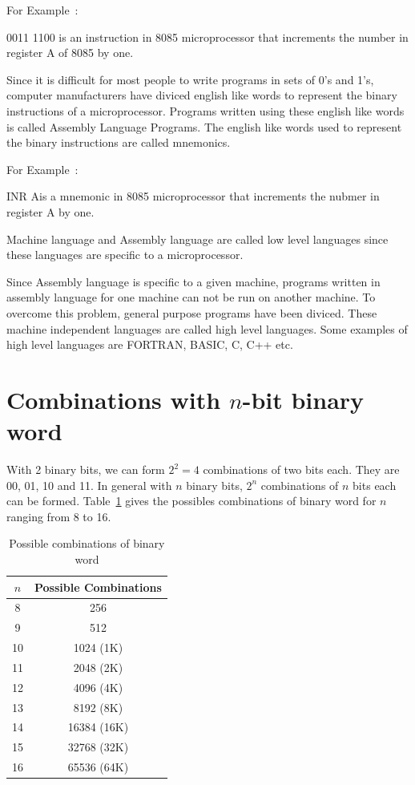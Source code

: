 For Example~:

0011 1100 is an instruction in 8085 microprocessor that increments the number in register A of 8085 by one.

\medskip
{}

Since it is difficult for most people to write programs in sets of 0's and 1's, computer manufacturers have diviced english like words to represent the binary instructions of a microprocessor. Programs written using these english like words is called Assembly Language Programs. The english like words used to represent the binary instructions are called mnemonics.

For Example~:

INR A\qquad is a mnemonic in 8085 microprocessor that increments the nubmer in register A by one.

Machine language and Assembly language are called low level languages since these languages are specific to a microprocessor.

\medskip
{}

\smallskip

Since Assembly language is specific to a given machine, programs written in assembly language for one machine can not be run on another machine. To overcome this problem, general purpose programs have been diviced. These machine independent languages are called high level languages. Some examples of high level languages are FORTRAN, BASIC, C, C++ etc.

\section{Combinations with \boldmath$n$-bit binary word}\label{sec7.7}

With 2 binary bits, we can form $2^{2}=4$ combinations of two bits each. They are 00, 01, 10 and 11. In general with $n$ binary bits, $2^{n}$ combinations of $n$ bits each can be formed. Table~\ref{tab7.1} gives the possibles combinations of binary word for $n$ ranging from 8 to 16.

\smallskip
\begin{table}[h]
\centering
\caption{Possible combinations of binary word}\label{tab7.1}
\renewcommand{\arraystretch}{1.05}
\tabcolsep=10pt
\begin{tabular}{|c|c|}
\hline
{\boldmath$n$} & {\bf Possible Combinations}\\
\hline
8 & 256\\
9 & 512\\
10 & 1024 (1K)\\
11 & 2048 (2K)\\
12 & 4096 (4K)\\
13 & 8192 (8K)\\
14 & 16384 (16K)\\
15 & 32768 (32K)\\
16 & 65536 (64K)\\
\hline
\end{tabular}
\end{table}

